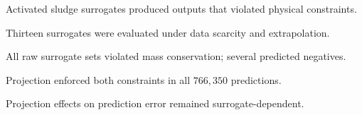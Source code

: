 \documentclass[a4paper,fleqn]{cas-sc}
\title[mode=title]{}
\author{}
\begin{document}
\begin{highlights}
\item Activated sludge surrogates produced outputs that violated physical constraints.
\item Thirteen surrogates were evaluated under data scarcity and extrapolation.
\item All raw surrogate sets violated mass conservation; several predicted negatives.
\item Projection enforced both constraints in all $766{,}350$ predictions.
\item Projection effects on prediction error remained surrogate-dependent.
\end{highlights}

\thispagestyle{empty}
\unvbox\casauhlbox
\end{document}
